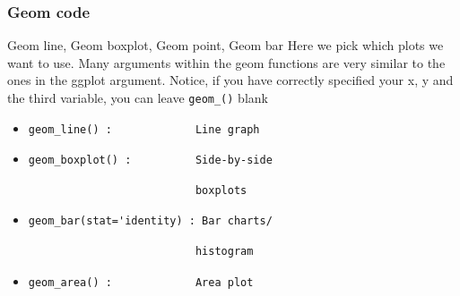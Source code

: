 \documentclass[nogin]{beamer}\usepackage[]{graphicx}\usepackage[]{color}
\begin{document}
\begin{frame}[fragile]
\frametitle{Geom code}
\begin{block}{Geom line, Geom boxplot, Geom point, Geom bar}
Here we pick which plots we want to use. Many arguments within the geom functions are very similar to the ones in the ggplot argument. Notice, if you have correctly specified your  x, y and the third variable, you can leave \verb|geom_()| blank
\end{block}
\begin{itemize}
\item 
\begin{verbatim}geom_line() :             Line graph
\end{verbatim}
\item
\begin{verbatim}geom_boxplot() :          Side-by-side \end{verbatim}
\begin{verbatim}                          boxplots
\end{verbatim}
\item
\begin{verbatim}geom_bar(stat='identity) : Bar charts/\end{verbatim}
\begin{verbatim}                          histogram
\end{verbatim}
\item
\begin{verbatim}geom_area() :             Area plot
\end{verbatim}
\end{itemize}
\end{frame}
\end{document}
